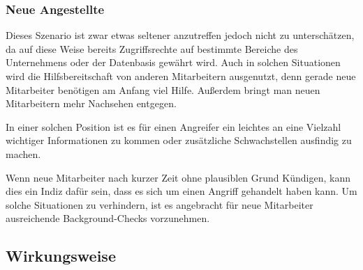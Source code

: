 
\subsubsection*{Neue Angestellte}\label{sec:neue-angestellte}
Dieses Szenario ist zwar etwas seltener anzutreffen jedoch nicht zu unterschätzen, da auf diese
Weise bereits Zugriffsrechte auf bestimmte Bereiche des Unternehmens oder der Datenbasis gewährt wird.
Auch in solchen Situationen wird die Hilfsbereitschaft von anderen Mitarbeitern ausgenutzt, denn
gerade neue Mitarbeiter benötigen am Anfang viel Hilfe.
Außerdem bringt man neuen Mitarbeitern mehr Nachsehen entgegen.

In einer solchen Position ist es für einen Angreifer ein leichtes an eine Vielzahl wichtiger
Informationen zu kommen oder zusätzliche Schwachstellen ausfindig zu machen.

Wenn neue Mitarbeiter nach kurzer Zeit ohne plausiblen Grund Kündigen, kann dies ein Indiz dafür sein,
dass es sich um einen Angriff gehandelt haben kann.
Um solche Situationen zu verhindern, ist es angebracht für neue Mitarbeiter ausreichende Background-Checks vorzunehmen. \cite{hacking-the-human}

\subsection{Wirkungsweise}\label{sec:wirkungsweise}
